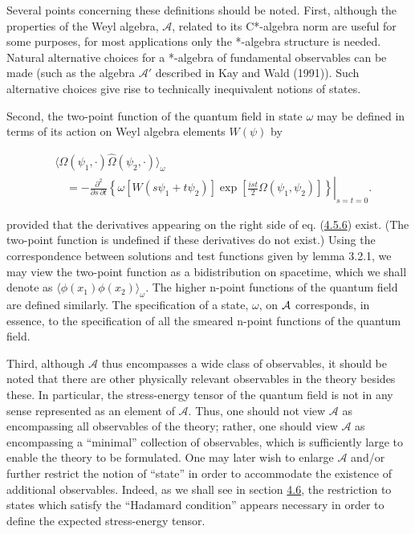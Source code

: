 \documentclass[11pt,a4paper]{article}
\begin{document}
Several points concerning these definitions should be noted. First, although the properties of the Weyl algebra, \(\mathcal{A}\), related to its C*-algebra norm are useful for some purposes, for most applications only the *-algebra structure is needed. Natural alternative choices for a *-algebra of fundamental observables can be made (such as the algebra \(\mathcal{A}'\) described in Kay and Wald (1991)). Such alternative choices give rise to technically inequivalent notions of states.

Second, the two-point function of the quantum field in state \(\omega\) may be defined in terms of its action on Weyl algebra elements \(W(\psi)\) by

\hypertarget{source-88}{}
\begin{equation*}
\begin{aligned}
&\langle\widehat\Omega(\psi_1,\cdot)\widehat\Omega(\psi_2,\cdot)\rangle_\omega\\
&\quad=-\left.\frac{\partial^2}{\partial s\,\partial t}\left\{\omega[W(s\psi_1+t\psi_2)]\exp\left[\frac{ist}{2}\Omega(\psi_1,\psi_2)\right]\right\}\right|_{s=t=0}.
\end{aligned} \tag{4.5.6}\label{eq:4.5.6}
\end{equation*}

provided that the derivatives appearing on the right side of eq. (\hyperref[eq:4.5.6]{4.5.6}) exist. (The two-point function is undefined if these derivatives do not exist.) Using the correspondence between solutions and test functions given by lemma 3.2.1, we may view the two-point function as a bidistribution on spacetime, which we shall denote as \(\langle \phi(x_1)\phi(x_2)\rangle _{\omega}\). The higher n-point functions of the quantum field are defined similarly. The specification of a state, \(\omega\), on \({\cal A}\) corresponds, in essence, to the specification of all the smeared n-point functions of the quantum field.

Third, although \(\mathcal A\) thus encompasses a wide class of observables, it should be noted that there are other physically relevant observables in the theory besides these. In particular, the stress-energy tensor of the quantum field is not in any sense represented as an element of \(\mathcal A\). Thus, one should not view \(\mathcal A\) as encompassing all observables of the theory; rather, one should view \(\mathcal A\) as encompassing a ``minimal'' collection of observables, which is sufficiently large to enable the theory to be formulated. One may later wish to enlarge \(\mathcal A\) and/or further restrict the notion of ``state'' in order to accommodate the existence of additional observables. Indeed, as we shall see in section \hyperlink{sec:4.6}{4.6}, the restriction to states which satisfy the ``Hadamard condition'' appears necessary in order to define the expected stress-energy tensor.
\end{document}
